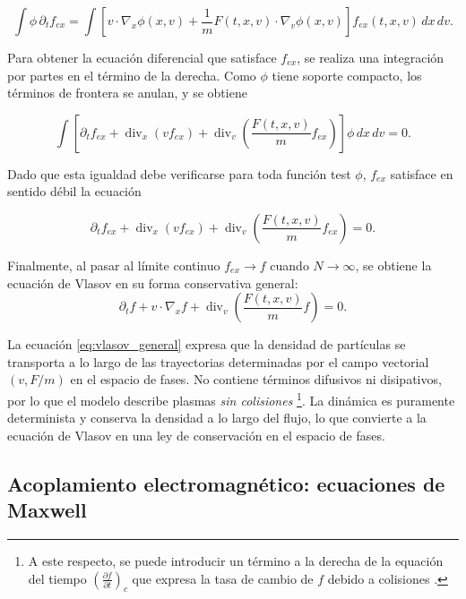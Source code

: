 \documentclass[11pt,a4paper,twoside,pdf]{article}
\numberwithin{equation}{section}
\begin{document}
\[
\int \phi\,\partial_t f_{ex}
= \int \left[
v\cdot\nabla_x\phi(x,v)
+ \frac{1}{m}F(t,x,v)\cdot\nabla_v\phi(x,v)
\right] f_{ex}(t,x,v)\,dx\,dv.
\]



\medskip

Para obtener la ecuación diferencial que satisface $f_{ex}$, se realiza una
integración por partes en el término de la derecha. Como $\phi$ tiene soporte
compacto, los términos de frontera se anulan, y se obtiene


\[
\int \left[
\partial_t f_{ex}
+ \operatorname{div}_x(v f_{ex})
+ \operatorname{div}_v\!\left(\frac{F(t,x,v)}{m} f_{ex}\right)
\right]\phi\,dx\,dv = 0.
\]



Dado que esta igualdad debe verificarse para toda función test $\phi$, $f_{ex}$ satisface en sentido débil la ecuación


\[
\partial_t f_{ex}
+ \operatorname{div}_x(v f_{ex})
+ \operatorname{div}_v\!\left(\frac{F(t,x,v)}{m} f_{ex}\right)=0.
\]



Finalmente, al pasar al límite continuo $f_{ex}\to f$ cuando $N\to\infty$, se obtiene
la ecuación de Vlasov en su forma conservativa general:
\begin{equation}
\partial_t f + v\cdot\nabla_x f
+ \operatorname{div}_v\!\left(\frac{F(t,x,v)}{m}f\right)=0.
\label{eq:vlasov_general}
\end{equation}

\medskip


La ecuación \eqref{eq:vlasov_general} expresa que la densidad de partículas se
transporta a lo largo de las trayectorias determinadas por el campo vectorial
$(v,F/m)$ en el espacio de fases. No contiene términos difusivos ni disipativos,
por lo que el modelo describe plasmas \emph{sin colisiones} \footnote{A este respecto, se puede introducir un término a la derecha de la equación del tiempo $\left( \frac{\partial f}{\partial t} \right)_c$ que expresa la tasa de cambio de $f$ debido a colisiones \cite{chen1984introduction}.}. La dinámica es
puramente determinista y conserva la densidad a lo largo del flujo, lo que convierte
a la ecuación de Vlasov en una ley de conservación en el espacio de fases.




\subsection{Acoplamiento electromagnético: ecuaciones de Maxwell}
\end{document}
